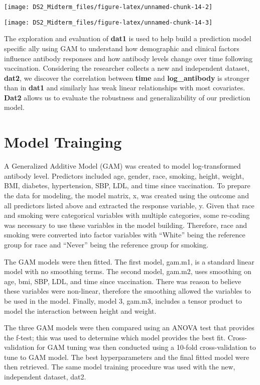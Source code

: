 \documentclass[
]{article}
\begin{document}
\begin{center}\texttt{[image: DS2\_Midterm\_files/figure-latex/unnamed-chunk-14-2]} \end{center}

\begin{center}\texttt{[image: DS2\_Midterm\_files/figure-latex/unnamed-chunk-14-3]} \end{center}

The exploration and evaluation of \textbf{dat1} is used to help build a
prediction model specific ally using GAM to understand how demographic
and clinical factors influence antibody responses and how antibody
levels change over time following vaccination. Considering the
researcher collects a new and independent dataset, \textbf{dat2}, we
discover the correlation between \textbf{time} and
\textbf{log\_antibody} is stronger than in \textbf{dat1} and similarly
has weak linear relationships with most covariates. \textbf{Dat2} allows
us to evaluate the robustness and generalizability of our prediction
model.

\section{Model Trainging}\label{model-trainging}

A Generalized Additive Model (GAM) was created to model log-transformed
antibody level. Predictors included age, gender, race, smoking, height,
weight, BMI, diabetes, hypertension, SBP, LDL, and time since
vaccination. To prepare the data for modeling, the model matrix, x, was
created using the outcome and all predictors listed above and extracted
the response variable, y. Given that race and smoking were categorical
variables with multiple categories, some re-coding was necessary to use
these variables in the model building. Therefore, race and smoking were
converted into factor variables with ``White'' being the reference group
for race and ``Never'' being the reference group for smoking.

The GAM models were then fitted. The first model, gam.m1, is a standard
linear model with no smoothing terms. The second model, gam.m2, uses
smoothing on age, bmi, SBP, LDL, and time since vaccination. There was
reason to believe these variables were non-linear, therefore the
smoothing allowed the variables to be used in the model. Finally, model
3, gam.m3, includes a tensor product to model the interaction between
height and weight.

The three GAM models were then compared using an ANOVA test that
provides the f-test; this was used to determine which model provides the
best fit. Cross-validation for GAM tuning was then conducted using a
10-fold cross-validation to tune to GAM model. The best hyperparameters
and the final fitted model were then retrieved. The same model training
procedure was used with the new, independent dataset, dat2.
\end{document}
